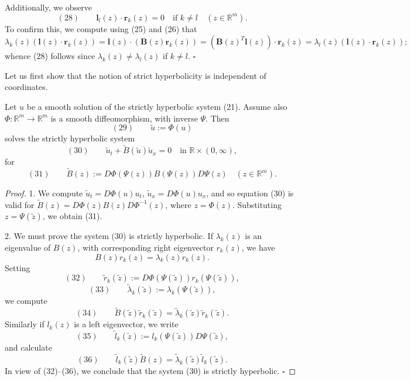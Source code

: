 \begin{remark}
\label{rem:eigenvector-orthogonality}
Additionally, we observe
$$(28) \qquad \mathbf{l}_l(z)\cdot\mathbf{r}_k(z) = 0 \quad \text{if } k\neq l \quad (z\in\mathbb{R}^m).$$
To confirm this, we compute using (25) and (26) that
$$\lambda_k(z)(\mathbf{l}(z)\cdot\mathbf{r}_k(z)) = \mathbf{l}(z)\cdot(\mathbf{B}(z)\mathbf{r}_k(z)) = (\mathbf{B}(z)^T\mathbf{l}(z))\cdot\mathbf{r}_k(z) = \lambda_l(z)(\mathbf{l}(z)\cdot\mathbf{r}_k(z));$$
whence (28) follows since $\lambda_k(z)\neq\lambda_l(z)$ if $k\neq l$. $\square$
\end{remark}

Let us first show that the notion of strict hyperbolicity is independent of coordinates.

\begin{theorem}
\label{thm:invariance-hyperbolicity-coordinate-change}
Let $u$ be a smooth solution of the strictly hyperbolic system (21). Assume also $\Phi:\mathbb{R}^m\to\mathbb{R}^m$ is a smooth diffeomorphism, with inverse $\Psi$. Then
$$(29) \qquad \tilde{u} := \Phi(u)$$
solves the strictly hyperbolic system
$$(30) \qquad \tilde u_t + \tilde B(\tilde u)\tilde u_x = 0 \quad \text{in } \mathbb{R}\times(0,\infty),$$
for
$$(31) \qquad \tilde B(z) := D\Phi(\Psi(z))B(\Psi(z))D\Psi(z) \quad (z\in\mathbb{R}^m).$$
\end{theorem}

\begin{proof}
1. We compute $\tilde u_t = D\Phi(u)u_t$, $\tilde u_x = D\Phi(u)u_x$, and so equation (30) is valid for $\tilde B(z) = D\Phi(z)B(z)D\Phi^{-1}(z)$, where $z=\Phi(z)$. Substituting $z=\Psi(\tilde z)$, we obtain (31).

2. We must prove the system (30) is strictly hyperbolic. If $\lambda_k(z)$ is an eigenvalue of $B(z)$, with corresponding right eigenvector $r_k(z)$, we have
$$B(z)r_k(z) = \lambda_k(z)r_k(z).$$
Setting
$$(32) \qquad \tilde r_k(\tilde z) := D\Phi(\Psi(\tilde z))r_k(\Psi(\tilde z)),$$
$$(33) \qquad \tilde\lambda_k(\tilde z) := \lambda_k(\Psi(\tilde z)),$$
we compute
$$(34) \qquad \tilde B(\tilde z)\tilde r_k(\tilde z) = \tilde\lambda_k(\tilde z)\tilde r_k(\tilde z).$$
Similarly if $l_k(z)$ is a left eigenvector, we write
$$(35) \qquad \tilde l_k(\tilde z) := l_k(\Psi(\tilde z))D\Psi(\tilde z),$$
and calculate
$$(36) \qquad \tilde l_k(\tilde z)\tilde B(z) = \tilde\lambda_k(\tilde z)\tilde l_k(\tilde z).$$
In view of (32)--(36), we conclude that the system (30) is strictly hyperbolic. $\square$
\end{proof}

